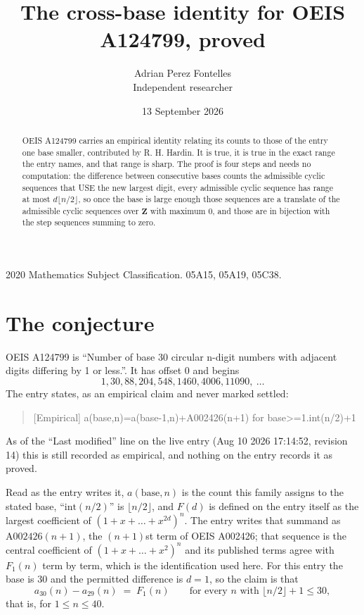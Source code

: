 \documentclass[11pt,a4paper]{article}
\title{The cross-base identity for OEIS A124799, proved}
\author{Adrian Perez Fontelles\\ \small Independent researcher}
\date{13 September 2026}
\theoremstyle{plain}
\theoremstyle{definition}
\begin{document}
\maketitle

\begin{abstract}
OEIS A124799 carries an empirical identity relating its counts to those of the entry one base
smaller, contributed by R. H. Hardin. It is true, it is true in the exact range the entry
names, and that range is sharp. The proof is four steps and needs no computation: the
difference between consecutive bases counts the admissible cyclic sequences that USE the new
largest digit, every admissible cyclic sequence has range at most $d\lfloor n/2\rfloor$, so
once the base is large enough those sequences are a translate of the admissible cyclic
sequences over $\mathbf{Z}$ with maximum $0$, and those are in bijection with the step
sequences summing to zero.
\end{abstract}

\noindent\small 2020 Mathematics Subject Classification. 05A15, 05A19, 05C38.\normalsize

\section{The conjecture}

OEIS A124799 is ``Number of base 30 circular n-digit numbers with adjacent digits differing by 1 or less.''. It has offset $0$ and begins
\[
1, 30, 88, 204, 548, 1460, 4006, 11090,\ \dots
\]
The entry states, as an empirical claim and never marked settled:
\begin{quote}
[Empirical] a(base,n)=a(base-1,n)+A002426(n+1) for base>=1.int(n/2)+1
\end{quote}
As of the ``Last modified'' line on the live entry (Aug 10 2026 17:14:52, revision 14)
this is still recorded as empirical, and nothing on the entry records it as proved.

Read as the entry writes it, $a(\mathrm{base},n)$ is the count this family assigns to the
stated base, ``$\mathrm{int}(n/2)$'' is $\lfloor n/2\rfloor$, and $F(d)$ is defined on the
entry itself as the largest coefficient of $(1+x+\dots+x^{2d})^{n}$. The entry writes that summand as $\mathrm{A002426}(n+1)$, the $(n+1)$st term of OEIS A002426; that sequence is the central coefficient of $(1+x+\dots+x^{2})^{n}$ and its published terms agree with $F_{1}(n)$ term by term, which is the identification used here. For this entry
the base is $30$ and the permitted difference is $d=1$, so the claim is that
\[
a_{30}(n)-a_{29}(n)\;=\;F_{1}(n)
\qquad\text{for every } n \text{ with } \lfloor n/2\rfloor+1\le30,
\]
that is, for $1\le n\le40$.
\end{document}

